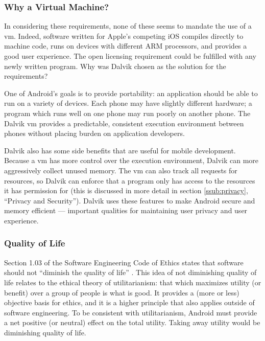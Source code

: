 \documentclass[11pt]{article}
\begin{document}
\begin{multicols}{2}

\subsubsection{Why a Virtual Machine?} %
\label{ssub:why-vm}

In considering these requirements, none of these seems to mandate the use of a
\gls{vm}.  Indeed, software written for Apple's competing iOS compiles directly
to machine code, runs on devices with different ARM processors, and provides a
good user experience.  The open licensing requirement could be fulfilled with
any newly written program.  Why was Dalvik chosen as the solution for the
requirements?

One of Android's goals is to provide portability: an application should be able
to run on a variety of devices.  Each phone may have slightly different
hardware; a program which runs well on one phone may run poorly on another
phone.  The Dalvik \gls{vm} provides a predictable, consistent execution
environment between phones without placing burden on application developers.

Dalvik also has some side benefits that are useful for mobile development.
Because a \gls{vm} has more control over the execution environment, Dalvik can
more aggressively collect unused memory.  The \gls{vm} can also track all
requests for resources, so Dalvik can enforce that a program only has access to
the resources it has permission for (this is discussed in more detail in section
\ref{ssub:privacy}, ``Privacy and Security'').  Dalvik uses these features to
make Android secure and memory efficient --- important qualities for maintaining
user privacy and user experience.


\subsubsection{Quality of Life} %
\label{ssub:quality}

Section 1.03 of the Software Engineering Code of Ethics states that software
should not ``diminish the quality of life'' \cite[\S1.03]{secode}.  This idea of
not diminishing quality of life relates to the ethical theory of utilitarianism:
that which maximizes utility (or benefit) over a group of people is what is
good.  It provides a (more or less) objective basis for ethics, and it is a
higher principle that also applies outside of software engineering.  To be
consistent with utilitarianism, Android must provide a net positive (or neutral)
effect on the total utility.  Taking away utility would be diminishing quality
of life.


\end{multicols}
\end{document}
